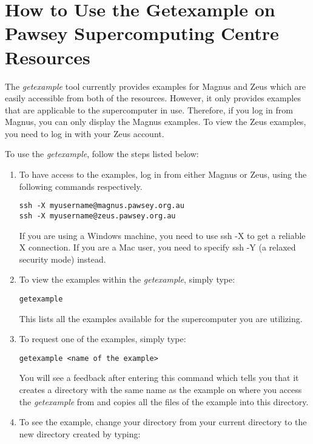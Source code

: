 \section{How to Use the Getexample on Pawsey Supercomputing Centre Resources}

The \emph{getexample} tool currently provides examples for Magnus and Zeus which are easily accessible from both of the resources. However, it only 
provides examples that are applicable to the supercomputer in use. Therefore, if you log in from Magnus, you can only display the Magnus examples. To 
view the Zeus examples, you need to log in with your Zeus account.

To use the \emph{getexample}, follow the steps listed below:

\begin{enumerate}
\item To have access to the examples, log in from either Magnus or Zeus, using the following commands respectively.
\begin{tcolorbox}
\begin{Verbatim}[fontsize=\small]
ssh -X myusername@magnus.pawsey.org.au
ssh -X myusername@zeus.pawsey.org.au
\end{Verbatim}
\end{tcolorbox}
If you are using a Windows machine, you need to use ssh -X to get a reliable X connection. If you are a Mac user, you need to specify ssh -Y (a relaxed
security mode) instead.
\item To view the examples within the \emph{getexample}, simply type:
\begin{tcolorbox}
\begin{Verbatim}[fontsize=\small]
getexample
\end{Verbatim}
\end{tcolorbox} 
This lists all the examples available for the supercomputer you are utilizing.
\item To request one of the examples, simply type: 
\begin{tcolorbox}
\begin{Verbatim}[fontsize=\small]
getexample <name of the example>
\end{Verbatim}
\end{tcolorbox} 
You will see a feedback after entering this command which tells you that it creates a directory with the same name as the example on where you access the 
\emph{getexample} from and copies all the files of the example into this directory.
\item To see the example, change your directory from your current directory to the new directory created by typing: 

\end{enumerate}
